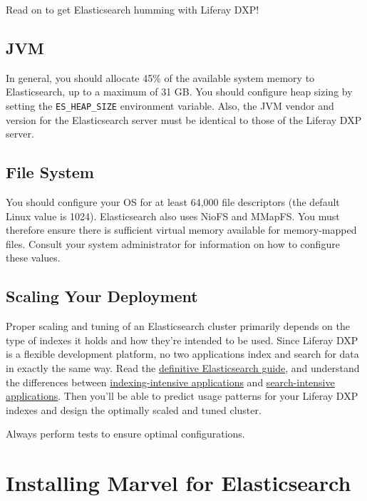 Read on to get Elasticsearch humming with Liferay DXP!

\subsection{JVM}\label{jvm}

In general, you should allocate 45\% of the available system memory to
Elasticsearch, up to a maximum of 31 GB. You should configure heap
sizing by setting the \texttt{ES\_HEAP\_SIZE} environment variable.
Also, the JVM vendor and version for the Elasticsearch server must be
identical to those of the Liferay DXP server.

\subsection{File System}\label{file-system}

You should configure your OS for at least 64,000 file descriptors (the
default Linux value is 1024). Elasticsearch also uses NioFS and MMapFS.
You must therefore ensure there is sufficient virtual memory available
for memory-mapped files. Consult your system administrator for
information on how to configure these values.

\subsection{Scaling Your Deployment}\label{scaling-your-deployment}

Proper scaling and tuning of an Elasticsearch cluster primarily depends
on the type of indexes it holds and how they're intended to be used.
Since Liferay DXP is a flexible development platform, no two
applications index and search for data in exactly the same way. Read the
\href{https://www.elastic.co/guide/en/elasticsearch/guide/master/distributed-cluster.html}{definitive
Elasticsearch guide}, and understand the differences between
\href{https://www.elastic.co/guide/en/elasticsearch/reference/master/tune-for-indexing-speed.html}{indexing-intensive
applications} and
\href{https://www.elastic.co/guide/en/elasticsearch/reference/master/tune-for-search-speed.html}{search-intensive
applications}. Then you'll be able to predict usage patterns for your
Liferay DXP indexes and design the optimally scaled and tuned cluster.

Always perform tests to ensure optimal configurations.

\section{Installing Marvel for
Elasticsearch}\label{installing-marvel-for-elasticsearch}

